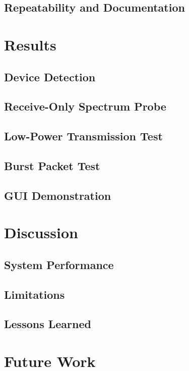 \documentclass[conference]{IEEEtran}
\begin{document}
\subsection{Repeatability and Documentation}

\section{Results}

\subsection{Device Detection}

\subsection{Receive-Only Spectrum Probe}

\subsection{Low-Power Transmission Test}

\subsection{Burst Packet Test}

\subsection{GUI Demonstration}

\section{Discussion}

\subsection{System Performance}

\subsection{Limitations}

\subsection{Lessons Learned}

\section{Future Work}
\end{document}
